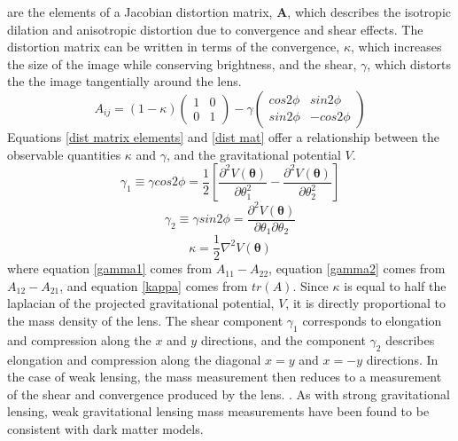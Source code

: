 \documentclass[a4paper,12pt]{article}
\begin{document}
are the elements of a Jacobian distortion matrix, $\mathbf{A}$, which describes the isotropic dilation and anisotropic distortion due to convergence and shear effects.  The distortion matrix can be written in terms of the convergence, $\kappa$, which increases the size of the image while conserving brightness, and the shear, $\gamma$, which distorts the the image tangentially around the lens.  
\begin{equation} \label{dist mat}
A_{ij}=(1-\kappa)(\begin{matrix} 1 & 0 \\ 0 & 1 \end{matrix}) - \gamma(\begin{matrix} cos2\phi & sin2\phi \\ sin2\phi & -cos2\phi \end{matrix}) 
\end{equation}
Equations \ref{dist matrix elements} and \ref{dist mat} offer a relationship between the observable quantities $\kappa$ and $\gamma$, and the gravitational potential $V$.
\begin{equation} \label{gamma1}
\gamma_1 \equiv \gamma cos 2\phi= \frac{1}{2}[\frac{ \partial ^2 V(\boldsymbol{\theta})}{\partial \theta_1^2} - \frac{ \partial^2 V(\boldsymbol{\theta})}{\partial \theta_2^2}]
\end{equation}
\begin{equation} \label{gamma2}
\gamma_2 \equiv \gamma sin 2\phi = \frac{ \partial^2 V(\boldsymbol{\theta})}{\partial \theta_1 \partial \theta_2}
\end{equation}
\begin{equation} \label{kappa}
\kappa = \frac{1}{2} \nabla^2 V(\boldsymbol{\theta})
\end{equation}
where equation \ref{gamma1} comes from $A_{11}-A_{22}$, equation \ref{gamma2} comes from $A_{12}-A_{21}$, and equation \ref{kappa} comes from $tr(A)$.  Since $\kappa$ is equal to half the laplacian of the projected gravitational potential, $V$, it is directly proportional to the mass density of the lens.  The shear component $\gamma_1$ corresponds to elongation and compression along the $x$ and $y$ directions, and the component $\gamma_2$ describes elongation and compression along the diagonal $x=y$ and $x=-y$ directions.  In the case of weak lensing, the mass measurement then reduces to a measurement of the shear and convergence produced by the lens. \cite{Pires}. As with strong gravitational lensing, weak gravitational lensing mass measurements have been found to be consistent with dark matter models. \cite{Xiang}
\end{document}
